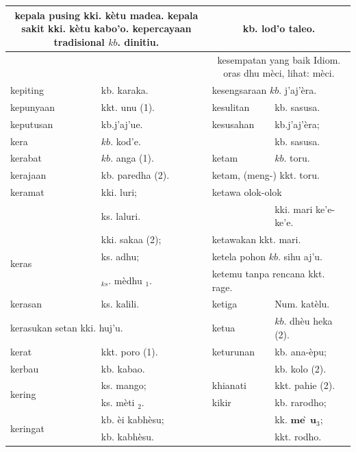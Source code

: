 \documentclass[10pt]{article}
\begin{document}
\begin{center}
\begin{tabular}{|l|l|l|l|}
\hline
\multicolumn{2}{|c|}{\multirow{2}{*}{kepala pusing kki. kètu madea. kepala sakit kki. kètu kabo'o. kepercayaan tradisional \(k b\). dinitiu.}} & \multicolumn{2}{|c|}{kb. lod'o taleo.} \\
\hline
 &  & \multicolumn{2}{|c|}{kesempatan yang baik Idiom. oras dhu mèci, lihat: mèci.} \\
\hline
kepiting & kb. karaka. & \multicolumn{2}{|l|}{kesengsaraan \(k b\). j'aj'èra.} \\
\hline
kepunyaan & kkt. unu (1). & kesulitan & kb. sasusa. \\
\hline
keputusan & kb.j'aj'ue. & kesusahan & kb.j'aj'èra; \\
\hline
kera & \(k b\). kod'e. &  & kb. sasusa. \\
\hline
kerabat & \(k b\). anga (1). & ketam & \(k b\). toru. \\
\hline
kerajaan & kb. paredha (2). & \multicolumn{2}{|l|}{ketam, (meng-) kkt. toru.} \\
\hline
keramat & kki. luri; & \multicolumn{2}{|l|}{ketawa olok-olok} \\
\hline
 & ks. laluri. &  & kki. mari ke'e-ke'e. \\
\hline
\multirow[t]{3}{*}{keras} & kki. sakaa (2); & \multicolumn{2}{|l|}{ketawakan kkt. mari.} \\
\hline
 & ks. adhu; & \multicolumn{2}{|l|}{ketela pohon \(k b\). sihu aj'u.} \\
\hline
 & \({ }_{k s}\). mèdhu \({ }_{1}\). & \multicolumn{2}{|l|}{ketemu tanpa rencana kkt. rage.} \\
\hline
kerasan & ks. kalili. & ketiga & Num. katèlu. \\
\hline
\multicolumn{2}{|l|}{kerasukan setan kki. huj'u.} & ketua & \(k b\). dhèu heka (2). \\
\hline
kerat & kkt. poro (1). & keturunan & kb. ana-èpu; \\
\hline
kerbau & kb. kabao. &  & kb. kolo (2). \\
\hline
\multirow[t]{2}{*}{kering} & ks. mango; & khianati & kkt. pahie (2). \\
\hline
 & ks. mèti \({ }_{2}\). & kikir & kb. rarodho; \\
\hline
\multirow[t]{2}{*}{keringat} & kb. èi kabhèsu; &  & kk. \(\mathbf{m e ̀ u}_{3}\); \\
\hline
 & kb. kabhèsu. &  & kkt. rodho. \\

\end{tabular}
\end{center}
\end{document}
